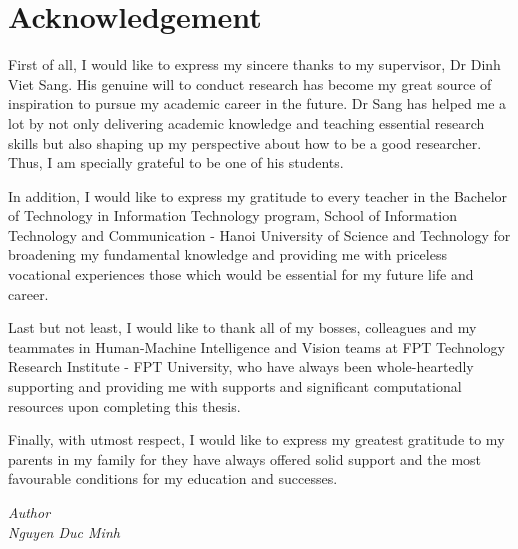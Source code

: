 \chapter*{Acknowledgement}
First of all, I would like to express my sincere thanks to my supervisor,
Dr Dinh Viet Sang. His genuine will to conduct research has become my great
source of inspiration to pursue my academic career in the future.
Dr Sang has helped me a lot by not only delivering academic knowledge and
teaching essential research skills but also shaping up my perspective about
how to be a good researcher. Thus, I am specially grateful to be one of his
students.


In addition, I would like to express my gratitude to every teacher in the
Bachelor of Technology in Information Technology program, School of Information
Technology and Communication - Hanoi University of Science and Technology for
broadening my fundamental knowledge and providing me with priceless vocational
experiences those which would be essential for my future life and career.


Last but not least, I would like to thank all of my bosses, colleagues and my
teammates in Human-Machine Intelligence and Vision teams at FPT Technology
Research Institute - FPT University, who have always been whole-heartedly
supporting and providing me with supports and significant computational
resources upon completing this thesis.


Finally, with utmost respect, I would like to express my greatest gratitude to
my parents in my family for they have always offered solid support and the most
favourable conditions for my education and successes.


\begin{minipage}{0.5\textwidth}
  \hfill
\end{minipage}
\begin{minipage}[t]{0.5\textwidth}
  \begin{center}
    \textit{Author\\[1cm]Nguyen Duc Minh}
  \end{center}
\end{minipage}
